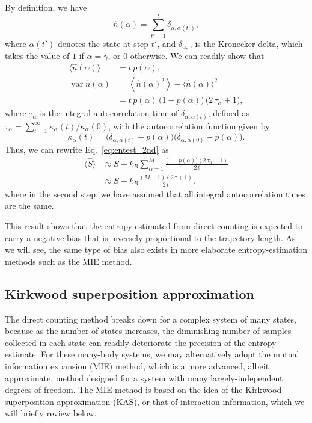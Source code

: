 \documentclass[preprint, superscriptaddress]{revtex4-1}
\begin{document}
By definition, we have
%
\begin{equation*}
  \hat{n}(\alpha) = \sum_{t' = 1}^t \delta_{\alpha, \alpha(t')},
\end{equation*}
%
where $\alpha(t')$ denotes the state at step $t'$,
and $\delta_{\alpha, \gamma}$ is the Kronecker delta,
which takes the value of $1$ if $\alpha = \gamma$, or $0$ otherwise.
%
We can readily show that
\begin{align*}
  \bigl\langle \hat{n}(\alpha) \bigr\rangle
  &=
  t \, p(\alpha), \\
  \operatorname{var}{\hat{n}(\alpha)}
  &=
  \left\langle \hat{n}(\alpha)^2 \right\rangle - \langle \hat{n}(\alpha) \rangle^2
  \\
  &=
  t \, p(\alpha) \, \bigl( 1 - p(\alpha) \bigr) \, \bigl(2 \, \tau_\alpha + 1\bigr)
  ,
\end{align*}
%
where $\tau_\alpha$ is the integral autocorrelation time of $\delta_{\alpha, \alpha(t)}$,
defined as $\tau_\alpha = \sum_{t = 1}^\infty \kappa_\alpha(t)/\kappa_\alpha(0)$,
with the autocorrelation function given by
$$
\kappa_\alpha(t) = \bigl(\delta_{\alpha, \alpha(t)} - p(\alpha)\bigr)
\bigl(\delta_{\alpha, \alpha(0)} - p(\alpha)\bigr).
$$
%
Thus, we can rewrite Eq.~\eqref{eq:entest_2nd} as
%
\begin{align*}
  \bigl\langle \hat S \bigr\rangle
  &\approx
  S - k_B \sum_{\alpha = 1}^M
    \frac{ \bigl(1 - p(\alpha)\bigr) ( 2 \, \tau_\alpha + 1) } { 2 \, t }
  \\
  &\approx
  S - k_B
    \frac{ (M - 1) ( 2 \, \tau + 1) } { 2 \, t }
  .
\end{align*}
where in the second step,
we have assumed that all integral autocorrelation times are the same.

This result shows that the entropy estimated
from direct counting
is expected to carry a negative bias
that is inversely proportional to the trajectory length.
%
As we will see, the same type of bias also exists
in more elaborate entropy-estimation methods
such as the MIE method.


\subsection{Kirkwood superposition approximation}


The direct counting method breaks down
for a complex system of many states,
because as the number of states increases,
the diminishing number of samples collected in each state
can readily deteriorate the precision of the entropy estimate.
%
For these many-body systems,
we may alternatively adopt
the mutual information expansion (MIE) method,
which is a more advanced, albeit approximate, method designed for a system
with many largely-independent degrees of freedom.
%
The MIE method is based on the idea of
the Kirkwood superposition approximation (KAS)\cite{kirkwood1935, born1946},
or that of interaction information\cite{mcgill1954},
which we will briefly review below.
\end{document}
